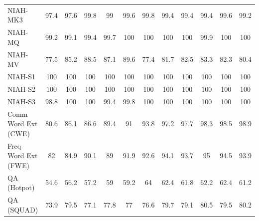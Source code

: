 \begin{table}[ht]
\begin{tabular}{l|ccccc|ccccc|c}
NIAH-MK3 & \cellcolor{myred!90} 97.4 & \cellcolor{myred!80} 97.6 & \cellcolor{royalblue!30} 99.8 & \cellcolor{myred!10} 99 & \cellcolor{royalblue!20} 99.6 & \cellcolor{royalblue!30} 99.8 & \cellcolor{royalblue!10} 99.4 & \cellcolor{royalblue!10} 99.4 & \cellcolor{royalblue!10} 99.4 & \cellcolor{royalblue!20} 99.6 & 99.2 \\
NIAH-MQ & \cellcolor{myred!70} 99.2 & \cellcolor{myred!90} 99.1 & \cellcolor{myred!60} 99.4 & \cellcolor{myred!25} 99.7 & \cellcolor{royalblue!5} 100 & 100 & 100 & 100 & \cellcolor{myred!5} 99.9 & 100 & 100 \\
NIAH-MV & \cellcolor{myred!29} 77.5 & \cellcolor{royalblue!47} 85.2 & \cellcolor{royalblue!79} 88.5 & \cellcolor{royalblue!65} 87.1 & \cellcolor{royalblue!90} 89.6 & \cellcolor{myred!29} 77.4 & \cellcolor{royalblue!13} 81.7 & \cellcolor{royalblue!21} 82.5 & \cellcolor{royalblue!28} 83.3 & \cellcolor{royalblue!18} 82.3 & 80.4 \\
NIAH-S1 & 100 & 100 & 100 & 100 & 100 & 100 & 100 & 100 & 100 & 100 & 100 \\
NIAH-S2 & 100 & 100 & 100 & 100 & 100 & 100 & 100 & 100 & 100 & 100 & 100 \\
NIAH-S3 & \cellcolor{myred!90} 98.8 & 100 & 100 & \cellcolor{myred!45} 99.4 & \cellcolor{myred!15} 99.8 & 100 & 100 & 100 & 100 & 100 & 100 \\
Comm Word Ext (CWE) & \cellcolor{myred!90} 80.6 & \cellcolor{myred!63} 86.1 & \cellcolor{myred!61} 86.6 & \cellcolor{myred!47} 89.4 & \cellcolor{myred!39} 91 & \cellcolor{myred!25} 93.8 & \cellcolor{myred!8} 97.2 & \cellcolor{myred!6} 97.7 & \cellcolor{myred!3} 98.3 & \cellcolor{myred!2} 98.5 & 98.9 \\
Freq Word Ext (FWE) & \cellcolor{myred!90} 82 & \cellcolor{myred!68} 84.9 & \cellcolor{myred!29} 90.1 & \cellcolor{myred!37} 89 & \cellcolor{myred!15} 91.9 & \cellcolor{myred!10} 92.6 & \cellcolor{royalblue!2} 94.1 & \cellcolor{myred!2} 93.7 & \cellcolor{royalblue!9} 95 & \cellcolor{royalblue!5} 94.5 & 93.9 \\
QA (Hotpot) & \cellcolor{myred!90} 54.6 & \cellcolor{myred!68} 56.2 & \cellcolor{myred!55} 57.2 & \cellcolor{myred!30} 59 & \cellcolor{myred!27} 59.2 & \cellcolor{royalblue!38} 64 & \cellcolor{royalblue!16} 62.4 & \cellcolor{royalblue!8} 61.8 & \cellcolor{royalblue!14} 62.2 & \cellcolor{royalblue!16} 62.4 & 61.2 \\
QA (SQUAD) & \cellcolor{myred!90} 73.9 & \cellcolor{myred!9} 79.5 & \cellcolor{myred!44} 77.1 & \cellcolor{myred!35} 77.8 & \cellcolor{myred!45} 77 & \cellcolor{myred!51} 76.6 & \cellcolor{myred!7} 79.7 & \cellcolor{myred!15} 79.1 & \cellcolor{royalblue!5} 80.5 & \cellcolor{myred!10} 79.5 & 80.2 \\

\end{tabular}
\end{table}
